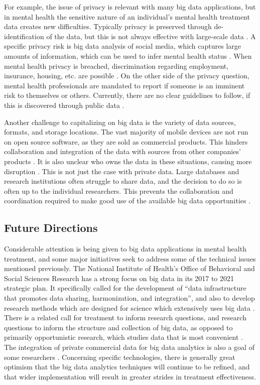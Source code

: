 \documentclass[sigconf]{acmart}
\begin{document}
For example, the issue of privacy is relevant with many big data applications, but in mental health the sensitive nature of an individual's mental health treatment data creates new difficulties. Typically privacy is preserved through de-identification of the data, but this is not always effective with large-scale data \cite{bigdatabipolar}. A specific privacy risk is big data analysis of social media, which captures large amounts of information, which can be used to infer mental health status \cite{detectdepressionsocialmedia}. When mental health privacy is breached, discrimination regarding employment, insurance, housing, etc. are possible \cite{bigdatabipolar}. On the other side of the privacy question, mental health professionals are mandated to report if someone is an imminent risk to themselves or others. Currently, there are no clear guidelines to follow, if this is discovered through public data \cite{detectdepressionsocialmedia}.

Another challenge to capitalizing on big data is the variety of data sources, formats, and storage locations. The vast majority of mobile devices are not run on open source software, as they are sold as commercial products. This hinders collaboration and integration of the data with sources from other companies' products \cite{bdfragment}. It is also unclear who owns the data in these situations, causing more disruption \cite{bigdatabipolar}. This is not just the case with private data. Large databases and research institutions often struggle to share data, and the decision to do so is often up to the individual researchers. This prevents the collaboration and coordination required to make good use of the available big data opportunities \cite{openinfrastructure}.

\subsection{Future Directions}

Considerable attention is being given to big data applications in mental health treatment, and some major initiatives seek to address some of the technical issues mentioned previously. The National Institute of Health's Office of Behavioral and Social Sciences Research has a strong focus on big data in its 2017 to 2021 strategic plan. It specifically called for the development of ``data infrastructure that promotes data sharing, harmonization, and integration'', and also to develop research methods which are designed for science which extensively uses big data \cite{nihstrategy}. There is a related call for treatment to inform research questions, and research questions to inform the structure and collection of big data, as opposed to primarily opportunistic research, which studies data that is most convenient \cite{bdmhtxfuture}.  The integration of private commercial data for big data analytics is also a goal of some researchers \cite{bdfragment}. Concerning specific technologies, there is generally great optimism that the big data analytics techniques will continue to be refined, and that wider implementation will result in greater strides in treatment effectiveness. 
\end{document}

